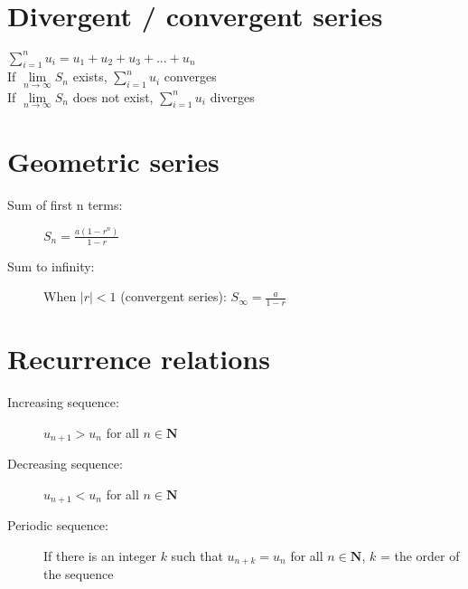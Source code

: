 \section{Divergent / convergent series}
$\sum\limits_{i=1}^{n} u_i = u_1+u_2+u_3+\dots+u_n$\\
If $\lim\limits_{n \to \infty}S_n$ exists, $\sum\limits_{i=1}^{n} u_i$ converges\\
If $\lim\limits_{n \to \infty}S_n$ does not exist, $\sum\limits_{i=1}^{n} u_i$ diverges
\section{Geometric series}
\begin{description}
    \item [Sum of first n terms:]$S_n = \frac{a(1-r^n)}{1-r}$
    \item [Sum to infinity:] When $|r|<1$ (convergent series): $S_\infty = \frac{a}{1-r}$
\end{description}

\section{Recurrence relations}
\begin{description}
    \item[Increasing sequence:] $u_{n+1}>u_n$ for all $n\in \mathbf{N}$
    \item[Decreasing sequence:] $u_{n+1}<u_n$ for all $n\in \mathbf{N}$
    \item[Periodic sequence:] If there is an integer $k$ such that $u_{n+k}=u_n$ for all $n\in \mathbf{N}$, $k$ = the order of the sequence
\end{description}